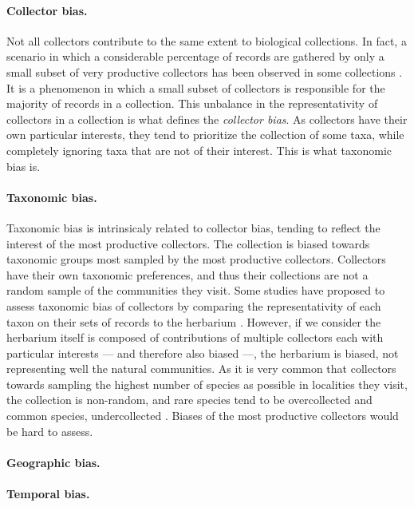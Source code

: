 \paragraph*{Collector bias.}
Not all collectors contribute to the same extent to biological collections.
In fact, a scenario in which a considerable percentage of records are gathered by only a small subset of very productive collectors has been observed in some collections \cite{Daru2017,Carine2012}.
It is a phenomenon in which a small subset of collectors is responsible for the majority of records in a collection.
This unbalance in the representativity of collectors in a collection is what defines the \textit{collector bias}.
%
As collectors have their own particular interests, they tend to prioritize the collection of some taxa, while completely ignoring taxa that are not of their interest.
This is what taxonomic bias is.

\paragraph*{Taxonomic bias.}
Taxonomic bias is intrinsicaly related to collector bias, tending to reflect the interest of the most productive collectors.
The collection is biased towards taxonomic groups most sampled by the most productive collectors.
%
Collectors have their own taxonomic preferences, and thus their collections are not a random sample of the communities they visit.
Some studies have proposed to assess taxonomic bias of collectors by comparing the representativity of each taxon on their sets of records to the herbarium \cite{Haripersaud2009}. %
However, if we consider the herbarium itself is composed of contributions of multiple collectors each with particular interests --- and therefore also biased ---, the herbarium is biased, not representing well the natural communities.
As it is very common that collectors towards sampling the highest number of species as possible in localities they visit, the collection is non-random, and rare species tend to be overcollected and common species, undercollected \cite{TerSteege2011}.
Biases of the most productive collectors would be hard to assess.

\paragraph*{Geographic bias.}

\paragraph*{Temporal bias.}

